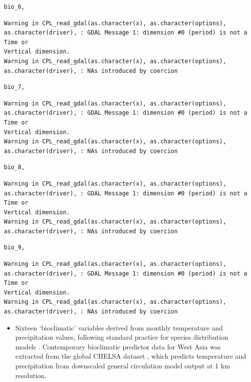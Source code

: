 \documentclass[
  authoryear,
  preprint]{elsarticle}
\providecommand{\tightlist}{%
  \setlength{\itemsep}{0pt}\setlength{\parskip}{0pt}}\usepackage{longtable,booktabs,array}
\begin{document}
\begin{verbatim}
bio_6, 
\end{verbatim}

\begin{verbatim}
Warning in CPL_read_gdal(as.character(x), as.character(options),
as.character(driver), : GDAL Message 1: dimension #0 (period) is not a Time or
Vertical dimension.
Warning in CPL_read_gdal(as.character(x), as.character(options),
as.character(driver), : NAs introduced by coercion
\end{verbatim}

\begin{verbatim}
bio_7, 
\end{verbatim}

\begin{verbatim}
Warning in CPL_read_gdal(as.character(x), as.character(options),
as.character(driver), : GDAL Message 1: dimension #0 (period) is not a Time or
Vertical dimension.
Warning in CPL_read_gdal(as.character(x), as.character(options),
as.character(driver), : NAs introduced by coercion
\end{verbatim}

\begin{verbatim}
bio_8, 
\end{verbatim}

\begin{verbatim}
Warning in CPL_read_gdal(as.character(x), as.character(options),
as.character(driver), : GDAL Message 1: dimension #0 (period) is not a Time or
Vertical dimension.
Warning in CPL_read_gdal(as.character(x), as.character(options),
as.character(driver), : NAs introduced by coercion
\end{verbatim}

\begin{verbatim}
bio_9, 
\end{verbatim}

\begin{verbatim}
Warning in CPL_read_gdal(as.character(x), as.character(options),
as.character(driver), : GDAL Message 1: dimension #0 (period) is not a Time or
Vertical dimension.
Warning in CPL_read_gdal(as.character(x), as.character(options),
as.character(driver), : NAs introduced by coercion
\end{verbatim}

\begin{itemize}
\tightlist
\item
  Sixteen `bioclimatic' variables derived from monthly temperature and
  precipitation values, following standard practice for species
  distribution models \citep{HijmansEtAl2005}. Contemporary bioclimatic
  predictor data for West Asia was extracted from the global CHELSA
  dataset \citep{KargerEtAl2017}, which predicts temperature and
  precipitation from downscaled general circulation model output at 1 km
  resolution.
\end{itemize}
\end{document}
